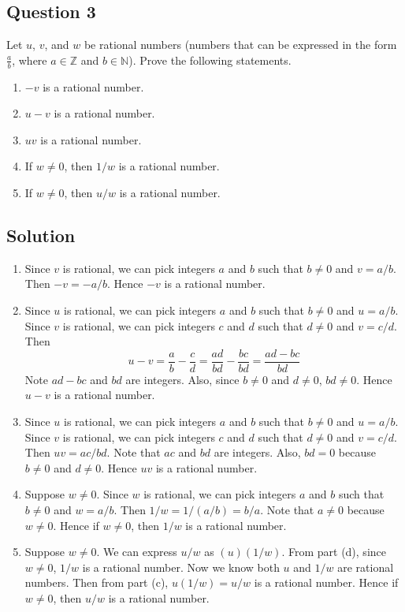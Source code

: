 \documentclass{article}
\begin{document}
\subsection*{Question 3}
Let $u$, $v$, and $w$ be rational numbers (numbers that can be expressed in the form $\frac{a}{b}$, where $a \in \mathbb{Z}$ and $b \in \mathbb{N}$). Prove the following statements.
    \begin{enumerate}
        \item $-v$ is a rational number.
        \item $u - v$ is a rational number.
        \item $uv$ is a rational number.
        \item If $w \ne 0$, then $1/w$ is a rational number.
        \item If $w \ne 0$, then $u/w$ is a rational number.
    \end{enumerate}

\subsection*{Solution}
    \begin{enumerate}
        \item Since $v$ is rational, we can pick integers $a$ and $b$ such that $b \ne 0$ and $v = a/b$. Then $-v = -a/b$. Hence $-v$ is a rational number.
        \item Since $u$ is rational, we can pick integers $a$ and $b$ such that $b \ne 0$ and $u = a/b$. Since $v$ is rational, we can pick integers $c$ and $d$ such that $d \ne 0$ and $v = c/d$. Then $$u - v  = \frac{a}{b} - \frac{c}{d} = \frac{ad}{bd} - \frac{bc}{bd} = \frac{ad - bc}{bd}$$
        Note $ad - bc$ and $bd$ are integers. Also, since $b \ne 0$ and $d \ne 0$, $bd \ne 0$. Hence $u - v$ is a rational number.
        \item Since $u$ is rational, we can pick integers $a$ and $b$ such that $b \ne 0$ and $u = a/b$. Since $v$ is rational, we can pick integers $c$ and $d$ such that $d \ne 0$ and $v = c/d$. Then $uv = ac/bd$. Note that $ac$ and $bd$ are integers. Also, $bd = 0$ because $b \ne 0$ and $d \ne 0$. Hence $uv$ is a rational number.
        \item Suppose $w \ne 0$. Since $w$ is rational, we can pick integers $a$ and $b$ such that $b \ne 0$ and $w = a/b$. Then $1/w = 1/(a/b) = b/a$. Note that $a \ne 0$ because $w \ne 0$. Hence if $w \ne 0$, then $1/w$ is a rational number.
        \item Suppose $w \ne 0$. We can express $u/w$ as $(u)(1/w)$. From part (d), since $w \ne 0$, $1/w$ is a rational number. Now we know both $u$ and $1/w$ are rational numbers. Then from part (c), $u(1/w) = u/w$ is a rational number. Hence if $w \ne 0$, then $u/w$ is a rational number.
    \end{enumerate}
\end{document}
